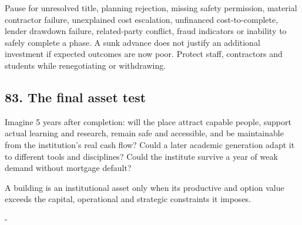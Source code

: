 Pause for unresolved title, planning rejection, missing safety permission, material contractor failure, unexplained cost escalation, unfinanced cost-to-complete, lender drawdown failure, related-party conflict, fraud indicators or inability to safely complete a phase. A sunk advance does not justify an additional investment if expected outcomes are now poor. Protect staff, contractors and students while renegotiating or withdrawing.


\subsection{83. The final asset test}

Imagine 5 years after completion: will the place attract capable people, support actual learning and research, remain safe and accessible, and be maintainable from the institution's real cash flow? Could a later academic generation adapt it to different tools and disciplines? Could the institute survive a year of weak demand without mortgage default?

A building is an institutional asset only when its productive and option value exceeds the capital, operational and strategic constraints it imposes.

-
